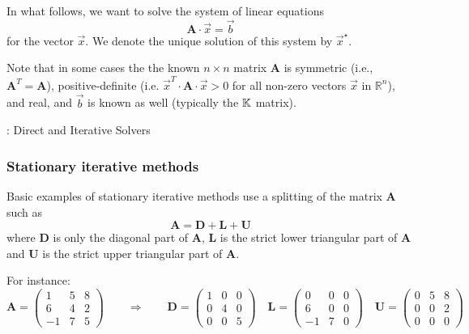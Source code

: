 
In what follows, we want to solve the system of linear equations
\begin{equation}
{\bm A}\cdot \vec{x} = \vec{b} 
\end{equation}
for the vector $\vec{x}$.
We denote the unique solution of this system by $\vec{x}^\star$.

Note that in some cases the the known $n\times n$ matrix ${\bm A}$ is 
symmetric (i.e., ${\bm A}^T = {\bm A}$), 
positive-definite (i.e. $\vec{x}^T\cdot {\bm A} \cdot \vec{x} > 0$ 
for all non-zero vectors $\vec{x}$ in $\mathbb{R}^n$), 
and real, and $\vec{b}$ is known as well (typically the ${\mathbb{K}}$ matrix). 


\Literature: Direct and Iterative Solvers \cite{lane18}


\subsubsection{Stationary iterative methods}


Basic examples of stationary iterative methods use a splitting of the matrix ${\bm A}$ such as
\[
{\bm A}={\bm D}+{\bm L}+{\bm U}
\]
where ${\bm D}$ is only the diagonal part of ${\bm A}$, 
${\bm L}$ is the strict lower triangular part of ${\bm A}$ and
${\bm U}$ is the strict upper triangular part of ${\bm A}$.

For instance:
\[
{\bm A}=
\left(
\begin{array}{ccc}
1 & 5 & 8 \\
6 & 4 & 2 \\
-1 & 7 & 5
\end{array}
\right)
\qquad
\Rightarrow
\qquad
{\bm D}=
\left(
\begin{array}{ccc}
1 & 0 & 0 \\
0 & 4 & 0 \\
0 & 0 & 5
\end{array}
\right)
\quad
{\bm L}=
\left(
\begin{array}{ccc}
0 & 0 & 0 \\
6 & 0 & 0 \\
-1 & 7 & 0
\end{array}
\right)
\quad
{\bm U}=
\left(
\begin{array}{ccc}
0 & 5 & 8 \\
0 & 0 & 2 \\
0 & 0 & 0
\end{array}
\right)
\]



